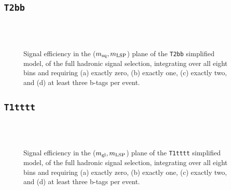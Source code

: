\newpage
\subsection{\texttt{T2bb}\label{app:sig-eff-t2bb}}

\begin{figure}[h!]
  \begin{center}
     \\
     \\
    \caption{\label{fig:sig-eff-t2bb}Signal efficiency in the ($m_{\rm
        sq},m_{\rm LSP}$) plane of the \texttt{T2bb} simplified model,
      of the full hadronic signal selection, integrating over all
      eight \HT bins and requiring (a) exactly zero, (b) exactly
      one, (c) exactly two, and (d) at least three b-tags per event.}
  \end{center}
\end{figure}

\newpage
\subsection{\texttt{T1tttt}\label{app:sig-eff-t1tttt}}

\begin{figure}[h!]
  \begin{center}
     \\
     \\
    \caption{\label{fig:sig-eff-t1tttt}Signal efficiency in the ($m_{\rm
        gl},m_{\rm LSP}$) plane of the \texttt{T1tttt} simplified model,
      of the full hadronic signal selection, integrating over all
      eight \HT bins and requiring (a) exactly zero, (b) exactly
      one, (c) exactly two, and (d) at least three b-tags per event.}
  \end{center}
\end{figure}

